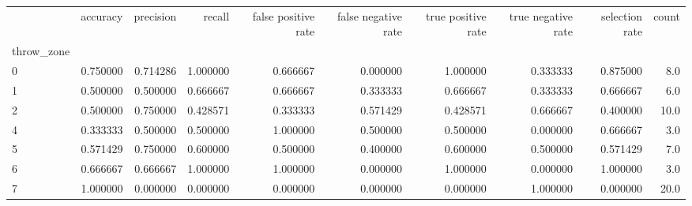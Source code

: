 \begin{tabular}{lrrrrrrrrr}
\toprule
{} &  accuracy &  precision &    recall &  false positive rate &  false negative rate &  true positive rate &  true negative rate &  selection rate &  count \\
throw\_zone &           &            &           &                      &                      &                     &                     &                 &        \\
\midrule
0          &  0.750000 &   0.714286 &  1.000000 &             0.666667 &             0.000000 &            1.000000 &            0.333333 &        0.875000 &    8.0 \\
1          &  0.500000 &   0.500000 &  0.666667 &             0.666667 &             0.333333 &            0.666667 &            0.333333 &        0.666667 &    6.0 \\
2          &  0.500000 &   0.750000 &  0.428571 &             0.333333 &             0.571429 &            0.428571 &            0.666667 &        0.400000 &   10.0 \\
4          &  0.333333 &   0.500000 &  0.500000 &             1.000000 &             0.500000 &            0.500000 &            0.000000 &        0.666667 &    3.0 \\
5          &  0.571429 &   0.750000 &  0.600000 &             0.500000 &             0.400000 &            0.600000 &            0.500000 &        0.571429 &    7.0 \\
6          &  0.666667 &   0.666667 &  1.000000 &             1.000000 &             0.000000 &            1.000000 &            0.000000 &        1.000000 &    3.0 \\
7          &  1.000000 &   0.000000 &  0.000000 &             0.000000 &             0.000000 &            0.000000 &            1.000000 &        0.000000 &   20.0 \\
\bottomrule
\end{tabular}

